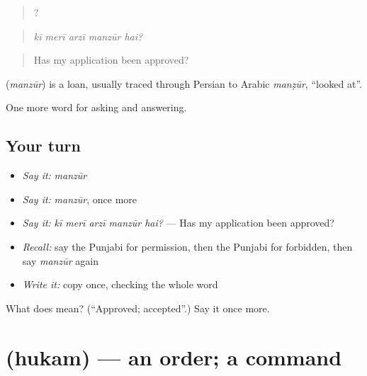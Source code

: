 \begin{quote}
    ?
\end{quote}

\begin{quote}
\emph{kī merī arzī manzūr hai?}
\end{quote}

\begin{quote}
Has my application been approved?
\end{quote}

\begin{cousinweb}
\textbf{} (\emph{manzūr}) is a loan, usually traced through Persian to Arabic \emph{manẓūr}, \textquotedblleft{}looked at\textquotedblright{}.
\end{cousinweb}

\begin{grammarlens}[title={What you've built}]
One more word for asking and answering.
\end{grammarlens}

\subsection*{Your turn}
\begin{itemize}
\raggedright
  \item \emph{Say it:} \emph{manzūr}
  \item \emph{Say it:} \emph{manzūr}, once more
  \item \emph{Say it:} \emph{kī merī arzī manzūr hai?} — Has my application been approved?
  \item \emph{Recall:} say the Punjabi for permission, then the Punjabi for forbidden, then say \emph{manzūr} again
  \item \emph{Write it:} copy \textbf{} once, checking the whole word
\end{itemize}

\begin{tcolorbox}[breakable,colback=teal!4,colframe=teal!35!black,title={Before you move on}]
What does  mean? (\textquotedblleft{}Approved; accepted\textquotedblright{}.) Say it once more.
\end{tcolorbox}
\section[\texorpdfstring{\pa{ਹੁਕਮ} (hukam)}{ਹੁਕਮ (hukam)}]{ (hukam) — an order; a command}

